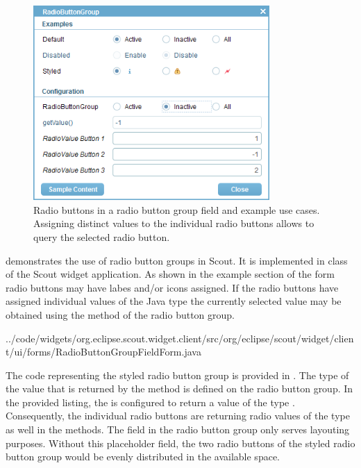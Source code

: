 \documentclass[a4paper,10pt,twoside]{book}
\begin{document}
{\begin{figure}
\includegraphics[width=9cm]{radiobuttonfield.png}
\caption{Radio buttons in a radio button group field and example use cases.
Assigning distinct values to the individual radio buttons allows to query the selected radio button.}
\end{figure}

 demonstrates the use of radio button groups in Scout. 
It is implemented in class  of the Scout widget application. 
As shown in the example section of the form radio buttons may have labes and/or icons assigned. 
If the radio buttons have assigned individual values of the Java type  the currently selected value may be obtained using the  method of the radio button group. 


{../code/widgets/org.eclipse.scout.widget.client/src/org/eclipse/scout/widget/client/ui/forms/RadioButtonGroupFieldForm.java}

The code representing the styled radio button group is provided in . 
The type of the value that is returned by the  method is defined on the radio button group. 
In the provided listing, the  is configured to return a value of the type . 
Consequently, the individual radio buttons are returning radio values of the type  as well in the  methods.
The field  in the radio button group only serves layouting purposes. 
Without this placeholder field, the two radio buttons of the styled radio button group would be evenly distributed in the available space. 

}
\end{document}
